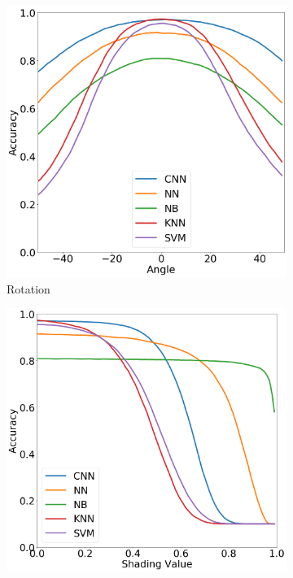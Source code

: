     \begin{figure}[htb!]
    \centering
    \begin{subfigure}[b]{0.3\textwidth}
        \centering
        \includegraphics[width=\textwidth]{chapters/results/MT/Rotate.png}
        \caption{Rotation}
    \end{subfigure}
    \begin{subfigure}[b]{ 0.3\textwidth}
        \centering
        \includegraphics[width=\textwidth]{chapters/results/MT/Shade.png}

\end{subfigure}
\end{figure}
